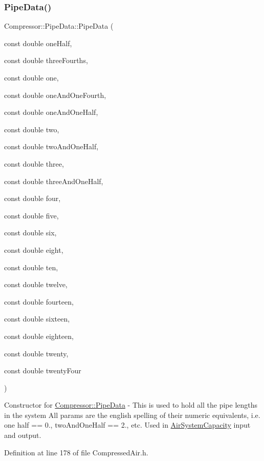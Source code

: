 \subsubsection{\texorpdfstring{Pipe\+Data()}{PipeData()}\hspace{0.1cm}{\footnotesize\ttfamily [5/6]}}
{\footnotesize\ttfamily Compressor\+::\+Pipe\+Data\+::\+Pipe\+Data (\begin{DoxyParamCaption}\item[{const double}]{one\+Half,  }\item[{const double}]{three\+Fourths,  }\item[{const double}]{one,  }\item[{const double}]{one\+And\+One\+Fourth,  }\item[{const double}]{one\+And\+One\+Half,  }\item[{const double}]{two,  }\item[{const double}]{two\+And\+One\+Half,  }\item[{const double}]{three,  }\item[{const double}]{three\+And\+One\+Half,  }\item[{const double}]{four,  }\item[{const double}]{five,  }\item[{const double}]{six,  }\item[{const double}]{eight,  }\item[{const double}]{ten,  }\item[{const double}]{twelve,  }\item[{const double}]{fourteen,  }\item[{const double}]{sixteen,  }\item[{const double}]{eighteen,  }\item[{const double}]{twenty,  }\item[{const double}]{twenty\+Four }\end{DoxyParamCaption})\hspace{0.3cm}{\ttfamily [inline]}}

Constructor for \hyperlink{struct_compressor_1_1_pipe_data}{Compressor\+::\+Pipe\+Data} -\/ This is used to hold all the pipe lengths in the system All params are the english spelling of their numeric equivalents, i.\+e. one half == 0., two\+And\+One\+Half == 2., etc. Used in \hyperlink{class_compressor_1_1_air_system_capacity}{Air\+System\+Capacity} input and output. 

Definition at line 178 of file Compressed\+Air.\+h.

